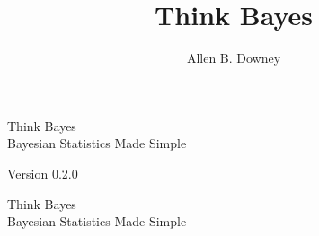 \documentclass[12pt]{book}
\title{Think Bayes}
\author{Allen B. Downey}
\newcommand{\theversion}{0.2.0}
\newif\ifplastex
\begin{document}
\frontmatter

\ifplastex

\else
\fi

\newcommand{\PMF}{\mathrm{PMF}}
\newcommand{\PDF}{\mathrm{PDF}}
\newcommand{\CDF}{\mathrm{CDF}}
\newcommand{\ICDF}{\mathrm{ICDF}}

\ifplastex
    \usepackage{localdef}
    \maketitle

\else



\begin{latexonly}

\renewcommand{\blankpage}{\thispagestyle{empty} \quad \newpage}


\thispagestyle{empty}

\begin{flushright}
\vspace*{2.0in}

\begin{spacing}{3}
{\huge Think Bayes}\\
{\Large Bayesian Statistics Made Simple}
\end{spacing}

\vspace{0.25in}

Version \theversion

\vfill

\end{flushright}


\blankpage
\blankpage

\pagebreak
\thispagestyle{empty}

\begin{flushright}
\vspace*{2.0in}

\begin{spacing}{3}
{\huge Think Bayes}\\
{\Large Bayesian Statistics Made Simple}
\end{spacing}

\vspace{0.25in}


\end{flushright}
\end{latexonly}
\end{document}
